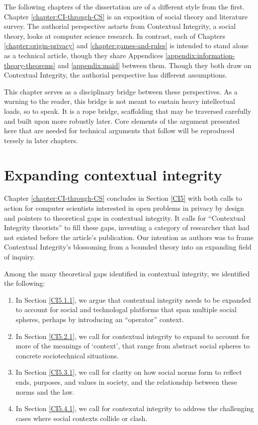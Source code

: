 \documentclass[../thesis.tex]{subfiles}
\begin{document}
 The following chapters of the dissertation are of
 a different style from the first.
 Chapter \ref{chapter:CI-through-CS} is an exposition of social theory and literature survey.
 The authorial perspective astarts from Contextual Integrity, a social theory, looks at computer science research.
 In contrast, each of Chapters \ref{chapter:origin-privacy} and
 \ref{chapter:games-and-rules} is intended to stand alone as a
 technical article, though they share Appendices
 \ref{appendix:information-theory-theorems}
 and \ref{appendix:maid} between them.
 Though they both draw on Contextual Integrity, the authorial perspective has different assumptions.

 This chapter serves as a disciplinary bridge between these perspectives.
 As a warning to the reader, this bridge is not meant to sustain heavy intellectual loads, so to speak.
 It is a rope bridge, scaffolding that may be traversed carefully and built upon more robustly later.
 Core elements of the argument presented here that are needed for technical arguments that follow will be reproduced tersely in later chapters.

\section{Expanding contextual integrity}

Chapter \ref{chapter:CI-through-CS} concludes in Section \ref{CI5} with both calls to action for computer scientists interested in open problems in privacy by design and pointers to theoretical gaps in contextual integrity.
 It calls for ``Contextual Integrity theorists'' to fill these gaps, inventing a category of researcher that had not existed before the article's publication.
 Our intention as authors was to frame Contextual Integrity's blossoming from a bounded theory into an expanding field of inquiry.
 
 Among the many theoretical gaps identified in contextual integrity,
 we identified the following:

 \begin{enumerate}
 \item In Section \ref{CI5.1.1}, we argue that
   contextual integrity needs to be expanded to account for
   social and technologal platforms that span multiple
   social spheres, perhaps by introducing an ``operator'' context.
 \item In Section \ref{CI5.2.1}, we call for contextual integrity
   to expand to account for more of the meanings of `context',
   that range from abstract social spheres to concrete
   sociotechnical situations.
 \item In Section \ref{CI5.3.1}, we call for clarity on how
   social norms form to reflect ends, purposes, and values in
   society, and the relationship between these norms and the law.
 \item In Section \ref{CI5.4.1}, we call for contexutal integrity
   to address the challenging cases where social contexts collide
   or clash.
 \end{enumerate}
\end{document}
